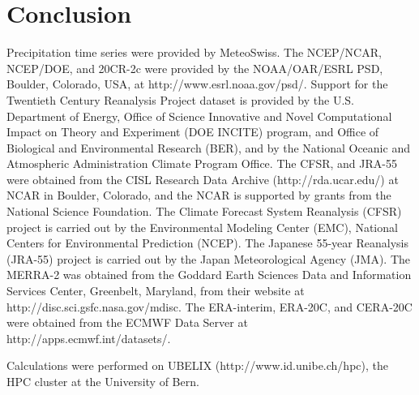 \documentclass{ametsoc}
\begin{document}
\section{Conclusion}


%
\acknowledgments
Precipitation time series were provided by MeteoSwiss. The NCEP/NCAR, NCEP/DOE, and 20CR-2c were provided by the NOAA/OAR/ESRL PSD, Boulder, Colorado, USA, at http://www.esrl.noaa.gov/psd/. Support for the Twentieth Century Reanalysis Project dataset is provided by the U.S. Department of Energy, Office of Science Innovative and Novel Computational Impact on Theory and Experiment (DOE INCITE) program, and Office of Biological and Environmental Research (BER), and by the National Oceanic and Atmospheric Administration Climate Program Office. The CFSR, and JRA-55 were obtained from the CISL Research Data Archive (http://rda.ucar.edu/) at NCAR in Boulder, Colorado, and the NCAR is supported by grants from the National Science Foundation. The Climate Forecast System Reanalysis (CFSR) project is carried out by the Environmental Modeling Center (EMC), National Centers for Environmental Prediction (NCEP). The Japanese 55-year Reanalysis (JRA-55) project is carried out by the Japan Meteorological Agency (JMA). The MERRA-2 was obtained from the Goddard Earth Sciences Data and Information Services Center, Greenbelt, Maryland, from their website at http://disc.sci.gsfc.nasa.gov/mdisc. The ERA-interim, ERA-20C, and CERA-20C were obtained from the ECMWF Data Server at http://apps.ecmwf.int/datasets/. 

Calculations were performed on UBELIX (http://www.id.unibe.ch/hpc), the HPC cluster at the University of Bern.


%



\end{document}
